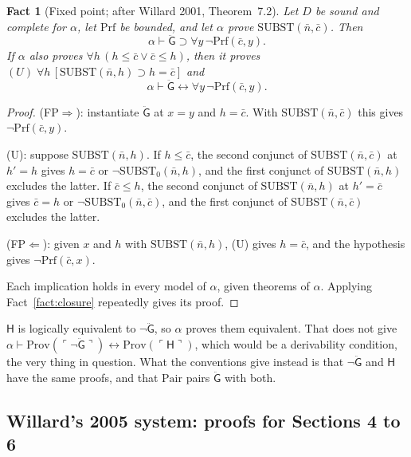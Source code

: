 \documentclass[11pt]{article}
\newcommand{\G}{\ddot{\mathsf{G}}}          %
\newcommand{\Hs}{\mathsf{H}}                %
\newcommand{\Prov}{\mathrm{Prov}}
\newcommand{\Prf}{\mathrm{Prf}}
\newcommand{\Subst}{\mathrm{SUBST}}
\newcommand{\Pair}{\mathrm{Pair}}
\newcommand{\gn}[1]{\ulcorner #1\urcorner}  %
\theoremstyle{plain}
\newtheorem{fact}[theorem]{Fact}
\theoremstyle{definition}
\begin{document}
\begin{fact}[Fixed point; after Willard 2001, Theorem~7.2]\label{fact:fp}
Let $D$ be sound and complete for $\alpha$, let $\Prf$ be bounded, and let
$\alpha$ prove $\Subst(\bar n, \bar c)$. Then
\[
\alpha \vdash \G \supset \forall y\,\neg\Prf(\bar c, y).
\tag{FP$\Rightarrow$}
\]
If $\alpha$ also proves $\forall h\,(h \le \bar c \vee \bar c \le h)$, then it
proves $(U)\;\forall h\,[\Subst(\bar n, h) \supset h = \bar c]$ and
\[
\alpha \vdash \G \leftrightarrow \forall y\,\neg\Prf(\bar c, y).
\tag{FP}
\]
\end{fact}

\begin{proof}
(FP$\Rightarrow$): instantiate $\G$ at $x = y$ and $h = \bar c$. With
$\Subst(\bar n, \bar c)$ this gives $\neg\Prf(\bar c, y)$.

(U): suppose $\Subst(\bar n, h)$. If $h \le \bar c$, the second conjunct of
$\Subst(\bar n, \bar c)$ at $h' = h$ gives $h = \bar c$ or
$\neg\Subst_0(\bar n, h)$, and the first conjunct of $\Subst(\bar n, h)$
excludes the latter. If $\bar c \le h$, the second conjunct of
$\Subst(\bar n, h)$ at $h' = \bar c$ gives $\bar c = h$ or
$\neg\Subst_0(\bar n, \bar c)$, and the first conjunct of
$\Subst(\bar n, \bar c)$ excludes the latter.

(FP$\Leftarrow$): given $x$ and $h$ with $\Subst(\bar n, h)$, (U) gives
$h = \bar c$, and the hypothesis gives $\neg\Prf(\bar c, x)$.

Each implication holds in every model of $\alpha$, given theorems of
$\alpha$. Applying Fact~\ref{fact:closure} repeatedly gives its proof.
\end{proof}

\noindent
$\Hs$ is logically equivalent to $\neg\G$, so $\alpha$ proves them
equivalent. That does not give $\alpha \vdash \Prov(\gn{\neg\G})
\leftrightarrow \Prov(\gn{\Hs})$, which would be a derivability condition, the
very thing in question. What the conventions give instead is that $\neg\G$
and $\Hs$ have the same proofs, and that $\Pair$ pairs $\G$ with both.

\subsection{Willard's 2005 system: proofs for Sections 4 to 6}
\end{document}
